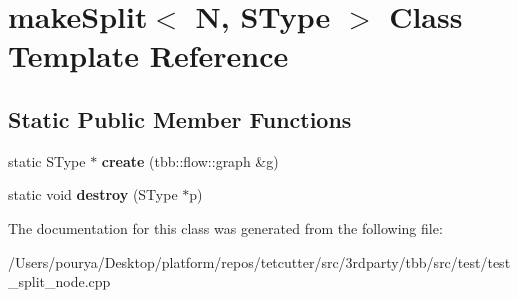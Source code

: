 \hypertarget{classmakeSplit}{}\section{make\+Split$<$ N, S\+Type $>$ Class Template Reference}
\label{classmakeSplit}
\subsection*{Static Public Member Functions}
\begin{DoxyCompactItemize}
\item 
\hypertarget{classmakeSplit_a9bb4406d081ae1133607edbd2ab0117a}{}static S\+Type $\ast$ {\bfseries create} (tbb\+::flow\+::graph \&g)\label{classmakeSplit_a9bb4406d081ae1133607edbd2ab0117a}

\item 
\hypertarget{classmakeSplit_abfc07f71499fe0f5293f6feff876a081}{}static void {\bfseries destroy} (S\+Type $\ast$p)\label{classmakeSplit_abfc07f71499fe0f5293f6feff876a081}

\end{DoxyCompactItemize}


The documentation for this class was generated from the following file\+:\begin{DoxyCompactItemize}
\item 
/\+Users/pourya/\+Desktop/platform/repos/tetcutter/src/3rdparty/tbb/src/test/test\+\_\+split\+\_\+node.\+cpp\end{DoxyCompactItemize}
